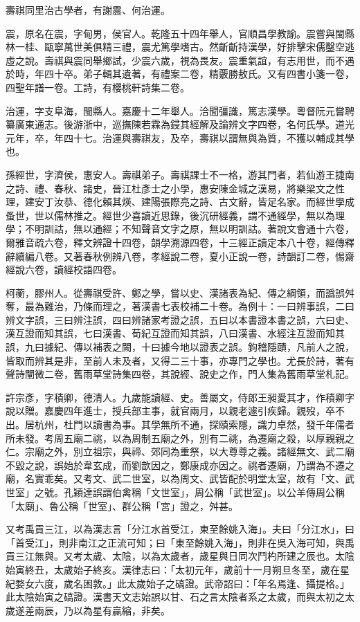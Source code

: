 \begin{pinyinscope}
壽祺同里治古學者，有謝震、何治運。

震，原名在震，字甸男，侯官人。乾隆五十四年舉人，官順昌學教諭。震嘗與閩縣林一桂、甌寧萬世美俱精三禮，震尤篤學嗜古。然齗齗持漢學，好排擊宋儒鑿空逃虛之說。壽祺與震同舉鄉試，少震六歲，視為畏友。震重氣誼，有志用世，而不遇於時，年四十卒。弟子輯其遺著，有禮案二卷，精覈勝敖氏。又有四書小箋一卷，四聖年譜一卷。工詩，有櫻桃軒詩集二卷。

治運，字支阜海，閩縣人。嘉慶十二年舉人。洽聞彊識，篤志漢學。粵督阮元嘗聘纂廣東通志。後游浙中，巡撫陳若霖為鋟其經解及論辨文字四卷，名何氏學。道光元年，卒，年四十七。治運與壽祺友，及卒，壽祺以謂無與為質，不獲以輔成其學也。

孫經世，字濟侯，惠安人。壽祺弟子。壽祺課士不一格，游其門者，若仙游王捷南之詩、禮、春秋、諸史，晉江杜彥士之小學，惠安陳金城之漢易，將樂梁文之性理，建安丁汝恭、德化賴其煐、建陽張際亮之詩、古文辭，皆足名家。而經世學成蚤世，世以儒林推之。經世少喜讀近思錄，後沉研經義，謂不通經學，無以為理學；不明訓詁，無以通經；不知聲音文字之原，無以明訓詁。著說文會通十六卷，爾雅音疏六卷，釋文辨證十四卷，韻學溯源四卷，十三經正讀定本八十卷，經傳釋辭續編八卷。又著春秋例辨八卷，孝經說二卷，夏小正說一卷，詩韻訂二卷，惕齋經說六卷，讀經校語四卷。

柯蘅，膠州人。從壽祺受許、鄭之學，嘗以史、漢諸表為紀、傳之綱領，而譌誤舛奪，最為難治，乃條而理之，著漢書七表校補二十卷。為例十：一曰辨事誤，二曰辨文字誤，三曰辨注誤，四曰辨諸家考證之誤，五曰以本書證本書之誤，六曰史、漢互證而知其誤，七曰漢書、荀紀互證而知其誤，八曰漢書、水經注互證而知其誤，九曰據紀、傳以補表之闕，十曰據今地以證表之誤。鉤稽隱賾，凡前人之說，皆取而辨其是非，至前人未及者，又得二三十事，亦專門之學也。尤長於詩，著有聲詩闡微二卷，舊雨草堂詩集四卷，其說經、說史之作，門人集為舊雨草堂札記。

許宗彥，字積卿，德清人。九歲能讀經、史。善屬文，侍郎王昶愛其才，作積卿字說以贈。嘉慶四年進士，授兵部主事，就官兩月，以親老遽引疾歸。親歿，卒不出。居杭州，杜門以讀書為事。其學無所不通，探賾索隱，識力卓然，發千年儒者所未發。考周五廟二祧，以為周制五廟之外，別有二祧，為遷廟之殺，以厚親親之仁。宗廟之外，別立祖宗，與禘、郊同為重祭，以大尊尊之義。諸經無文、武二廟不毀之說，誤始於韋玄成，而劉歆因之，鄭康成亦因之。祧者遷廟，乃謂為不遷之廟，名實乖矣。又考文、武二世室，以為周文、武皆配於明堂太室，故有「文、武世室」之號。孔穎達誤謂伯禽稱「文世室」，周公稱「武世室」。以公羊傳周公稱「太廟」、魯公稱「世室」、群公稱「宮」證之，舛甚。

又考禹貢三江，以為漢志言「分江水首受江，東至餘姚入海」。夫曰「分江水」，曰「首受江」，則非南江之正流可知；曰「東至餘姚入海」，則非在吳入海可知，與禹貢三江無與。又考太歲、太陰，以為太歲者，歲星與日同次鬥杓所建之辰也。太陰始寅終丑，太歲始子終亥。漢律志曰：「太初元年，歲前十一月朔旦冬至，歲在星紀婺女六度，歲名困敦。」此太歲始子之碻證。武帝詔曰：「年名焉逢、攝提格。」此太陰始寅之碻證。漢書天文志始誤以甘、石之言太陰者系之太歲，而與太初之太歲遂差兩辰，乃以為星有贏縮，非矣。


\end{pinyinscope}
